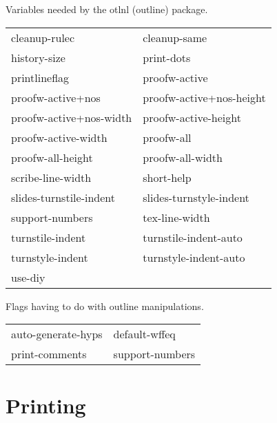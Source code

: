 \begin{description} 
\item[OTL-VARS]  
Variables needed by the otlnl (outline) package.

\begin{tabular}{l l}
cleanup-rulec&cleanup-same\\
history-size&print-dots\\
printlineflag&proofw-active\\
proofw-active+nos&proofw-active+nos-height\\
proofw-active+nos-width&proofw-active-height\\
proofw-active-width&proofw-all\\
proofw-all-height&proofw-all-width\\
scribe-line-width&short-help\\
slides-turnstile-indent&slides-turnstyle-indent\\
support-numbers&tex-line-width\\
turnstile-indent&turnstile-indent-auto\\
turnstyle-indent&turnstyle-indent-auto\\
use-diy
\end{tabular}

\item[OUTLINE]  
Flags having to do with outline manipulations.

\begin{tabular}{l l}
auto-generate-hyps&default-wffeq\\
print-comments&support-numbers\\
\end{tabular}
\item
\end{description}

\section{Printing}

